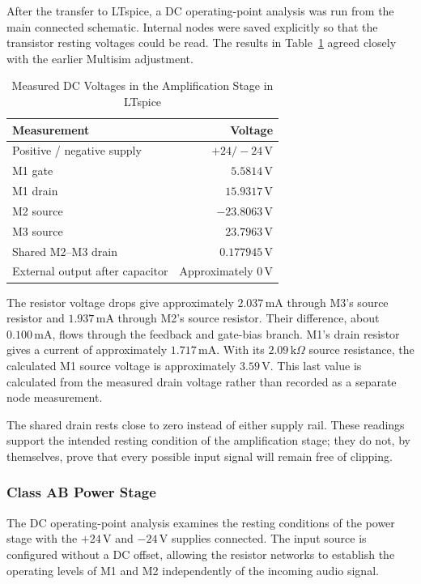 \documentclass[conference]{IEEEtran}
\begin{document}
After the transfer to LTspice, a DC operating-point analysis was run from the main connected schematic. Internal nodes were saved explicitly so that the transistor resting voltages could be read. The results in Table~\ref{tab:amplification_dc} agreed closely with the earlier Multisim adjustment.

\begin{table}[H]
\caption{Measured DC Voltages in the Amplification Stage in LTspice}
\label{tab:amplification_dc}
\centering
\begin{tabular}{lr}
\toprule
Measurement & Voltage \\
\midrule
Positive / negative supply & $+24 / -24\,\mathrm{V}$ \\
M1 gate & $5.5814\,\mathrm{V}$ \\
M1 drain & $15.9317\,\mathrm{V}$ \\
M2 source & $-23.8063\,\mathrm{V}$ \\
M3 source & $23.7963\,\mathrm{V}$ \\
Shared M2--M3 drain & $0.177945\,\mathrm{V}$ \\
External output after capacitor & Approximately $0\,\mathrm{V}$ \\
\bottomrule
\end{tabular}
\end{table}

The resistor voltage drops give approximately $2.037\,\mathrm{mA}$ through M3's source resistor and $1.937\,\mathrm{mA}$ through M2's source resistor. Their difference, about $0.100\,\mathrm{mA}$, flows through the feedback and gate-bias branch. M1's drain resistor gives a current of approximately $1.717\,\mathrm{mA}$. With its $2.09\,\mathrm{k}\Omega$ source resistance, the calculated M1 source voltage is approximately $3.59\,\mathrm{V}$. This last value is calculated from the measured drain voltage rather than recorded as a separate node measurement.

The shared drain rests close to zero instead of either supply rail. These readings support the intended resting condition of the amplification stage; they do not, by themselves, prove that every possible input signal will remain free of clipping.

\subsubsection{Class AB Power Stage}
The DC operating-point analysis examines the resting conditions of the power stage with the $+24\,\mathrm{V}$ and $-24\,\mathrm{V}$ supplies connected. The input source is configured without a DC offset, allowing the resistor networks to establish the operating levels of M1 and M2 independently of the incoming audio signal.
\end{document}
